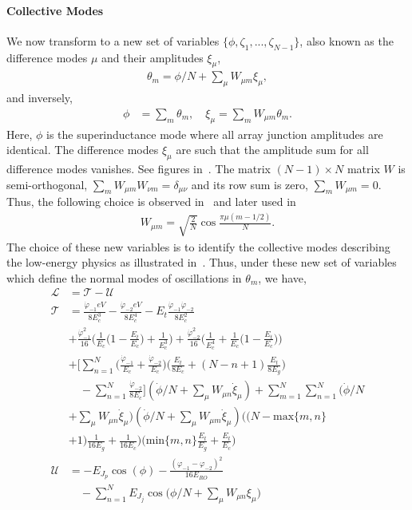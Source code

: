 \documentclass[prx,showpacs,notitlepage,twocolumn,superscriptaddress,nofootinbib,preprintnumbers,floatfix]{revtex4-2}
\begin{document}
\paragraph{Collective Modes} 
We now transform to a new set of variables $\{\phi,\zeta_1,...,\zeta_{N-1}\}$, also known as the difference modes $\mu$ and their amplitudes $\xi_\mu$,
\begin{align}
    \theta_m=\phi/N+\sum_\mu W_{\mu m}\xi_\mu,
\end{align}
and inversely,
\begin{align}
    \phi&=\sum_{m}\theta_m,\quad \xi_\mu=\sum_m W_{\mu m}\theta_m.
\end{align}
Here, $\phi$ is the superinductance mode where all array junction amplitudes are identical. The difference modes $\xi_\mu$ are such that the amplitude sum for all difference modes vanishes. See figures in~\cite{ferguson2013symmetries}. The matrix $(N-1)\times N$ matrix $W$ is semi-orthogonal, $\sum_m W_{\mu m}W_{\nu m}=\delta_{\mu \nu}$ and its row sum is zero, $\sum_mW_{\mu m}=0$. Thus, the following choice is observed in~\cite{ferguson2013symmetries} and later used in~\cite{viola2015collective}
\begin{align}
    W_{\mu m}=\sqrt{\frac{2}{N}}\cos{\frac{\pi\mu(m-1/2)}{N}}.
\end{align}
The choice of these new variables is to identify the collective modes describing the low-energy physics as illustrated in~\cite{catelani2011relaxation,koch2009charging,manucharyan2009fluxonium}. Thus, under these new set of variables which define the normal modes of oscillations in $\theta_m$, we have,
\begin{align}
    \mathcal{L}&=\mathcal{T}-\mathcal{U}\\
    \mathcal{T}&=\frac{\dot{\varphi}_{-1}eV}{8E_c^3}-\frac{\dot{\varphi}_{-2}eV}{8E_c^4}-E_t\frac{\dot{\varphi}_{-1}\dot{\varphi}_{-2}}{8E_c^2}\nonumber\\
    &+\frac{\dot{\varphi}^2_{-1}}{16}\Big(\frac{1}{E_c}\Big(1-\frac{E_t}{E_c}\Big)+\frac{1}{E_c^3}\Big)+\frac{\dot{\varphi}^2_{-2}}{16}\Big(\frac{1}{E_c^4}+\frac{1}{E_c}\Big(1-\frac{E_t}{E_c}\Big)\Big)\nonumber\\
      &+\Big[\sum_{n=1}^N\Big(\frac{\dot{\varphi}_{-1}}{E_c}+\frac{\dot{\varphi}_{-2}}{E_c}\Big)\Big(\frac{E_t}{8E_c}+(N-n+1)\frac{E_t}{8E_g}\Big)\nonumber\\&\quad-\sum_{n=1}^N\frac{\dot{\varphi}_{-2}}{8E_c}\Big](\dot{\phi}/N+\sum_\mu W_{\mu n}\dot{\xi}_\mu)+\sum_{m=1}^N\sum_{n=1}^N(\dot{\phi}/N\nonumber\\
  &+\sum_\mu W_{\mu n}\dot{\xi}_\mu)(\dot{\phi}/N+\sum_\mu W_{\mu m}\dot{\xi}_\mu)\Big( (N-\text{max}\{m,n\}\nonumber\\&+1)\frac{1}{16E_g}+\frac{1}{16E_c}\Big)\Big(\text{min}\{m,n\}\frac{E_t}{E_g}+\frac{E_t}{E_c}\Big)\label{eq:kin-energy}\\
    \mathcal{U}&=-E_{J_p}\cos(\phi)-\frac{(\varphi_{-1}-\varphi_{-2})^2}{16E_{RO}}\nonumber\\&\quad-\sum_{n=1}^NE_{J_j}\cos\Big(\phi/N+\sum_\mu W_{\mu n}\xi_\mu\Big)\label{eq:pot-energy}
\end{align}
\end{document}
